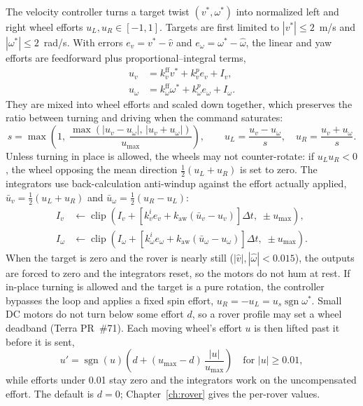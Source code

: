The velocity controller turns a target twist $(v^\ast, \omega^\ast)$ into normalized left and right wheel efforts $u_L, u_R \in [-1, 1]$.
Targets are first limited to $|v^\ast| \le 2$~m/s and $|\omega^\ast| \le 2$~rad/s.
With errors $e_v = v^\ast - \hat v$ and $e_\omega = \omega^\ast - \hat\omega$, the linear and yaw efforts are feedforward plus proportional--integral terms,
\begin{align}
  u_v &= k^{\text{ff}}_v v^\ast + k^{p}_v e_v + I_v, \label{eq:uv}\\
  u_\omega &= k^{\text{ff}}_\omega \omega^\ast + k^{p}_\omega e_\omega + I_\omega. \label{eq:uw}
\end{align}
They are mixed into wheel efforts and scaled down together, which preserves the ratio between turning and driving when the command saturates:
\begin{equation}
  s = \max\!\left(1,\; \frac{\max(|u_v - u_\omega|,\, |u_v + u_\omega|)}{u_{\max}}\right), \qquad
  u_L = \frac{u_v - u_\omega}{s}, \quad u_R = \frac{u_v + u_\omega}{s}.
  \label{eq:mix}
\end{equation}
Unless turning in place is allowed, the wheels may not counter-rotate: if $u_L u_R < 0$, the wheel opposing the mean direction $\tfrac12(u_L + u_R)$ is set to zero.
The integrators use back-calculation anti-windup against the effort actually applied, $\bar u_v = \tfrac12(u_L + u_R)$ and $\bar u_\omega = \tfrac12(u_R - u_L)$:
\begin{align}
  I_v &\leftarrow \operatorname{clip}\!\left(I_v + \left[k^{i}_v e_v + k_{\text{aw}}(\bar u_v - u_v)\right]\Delta t,\; \pm u_{\max}\right), \\
  I_\omega &\leftarrow \operatorname{clip}\!\left(I_\omega + \left[k^{i}_\omega e_\omega + k_{\text{aw}}(\bar u_\omega - u_\omega)\right]\Delta t,\; \pm u_{\max}\right).
\end{align}
When the target is zero and the rover is nearly still ($|\hat v|, |\hat\omega| < 0.015$), the outputs are forced to zero and the integrators reset, so the motors do not hum at rest.
If in-place turning is allowed and the target is a pure rotation, the controller bypasses the loop and applies a fixed spin effort, $u_R = -u_L = u_s \operatorname{sgn}\omega^\ast$.
Small DC motors do not turn below some effort $d$, so a rover profile may set a wheel deadband (Terra PR~\#71).
Each moving wheel's effort $u$ is then lifted past it before it is sent,
\begin{equation}
  u' = \operatorname{sgn}(u)\left(d + (u_{\max} - d)\,\frac{|u|}{u_{\max}}\right) \quad \text{for } |u| \ge 0.01,
\end{equation}
while efforts under 0.01 stay zero and the integrators work on the uncompensated effort.
The default is $d = 0$; Chapter~\ref{ch:rover} gives the per-rover values.

